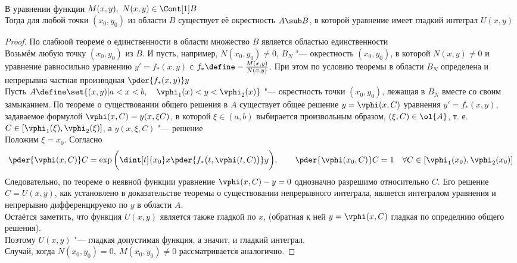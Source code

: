 \begin{theorem}
    \hfill \\
    В уравнении  функции $ M(x, y), ~ N(x, y) \in \Cont[1]B $ \\
    Тогда для любой точки $ (x_0, y_0) $ из области $ B $ существует её окрестность $ A \sub B $, в которой уравнение  имеет гладкий интеграл $ U(x, y) $
\end{theorem}

\begin{proof}
	По слабюой теореме о единственности в области множество $ B $ является областью единственности \\
    Возьмём любую точку $ (x_0, y_0) $ из $ B $. И пусть, например, $ N(x_0, y_0) \ne 0 $, $ B_N $ "--- окрестность $ (x_0, y_0) $, в которой $ N(x, y) \ne 0 $ и уравнение  равносильно уравнению  $ y' = f_*(x, y) $ с $ f_* \define - \frac{M(x, y)}{N(x, y)} $. При этом по условию теоремы в области $ B_N $ определена и непрерывна частная производная $ \pder{f_*(x, y)}y $ \\
    Пусть $ A \define \set{(x, y) | a < x < b, \quad \vphi_1(x) < y < \vphi_2(x)} $ "--- окрестность точки $ (x_0, y_0) $, лежащая в $ B_N $ вместе со своим замыканием. По теореме о существовании общего решения в $ A $ существует общее решение $ y = \vphi(x, C) $ уравнения $ y' = f_*(x, y) $, задаваемое формулой  $ \vphi(x, C) = y(x, \xi C) $, в которой $ \xi \in (a, b) $ выбирается произвольным образом, $ (\xi, C) \in \ol{A} $, т. е. $ C \in [\vphi_1(\xi), \vphi_2(\xi)] $, а $ y(x, \xi, C) $ "--- решение  \\
    Положим $ \xi = x_0 $. Согласно 
    $$ \pder{\vphi(x, C)}C = \exp \bigg( \dint[t]{x_0}x{\pder{f_* \big( t, \vphi(t, C) \big)}y} \bigg), \qquad \pder{\vphi(x_0, C)}C = 1 \quad \forall C \in [\vphi_1(x_0), \vphi_2(x_0)] $$
    Следовательно, по теореме о неявной функции уравнение $ \vphi(x, C) - y = 0 $ однозначно разрешимо относительно $ C $. Его решение $ C = U(x, y) $, как установлено в доказательстве теоремы о существовании непрерывного интеграла, является интегралом уравнения  и непрерывно дифференцируемо по $ y $ в области $ A $. \\
    Остаётся заметить, что функция $ U(x, y) $ является также гладкой по $ x $, (\as обратная к ней $ y = \vphi(x, C) $ гладкая по определнию общего решения). \\
    Поэтому $ U(x, y) $ "--- гладкая допустимая функция, а значит, и гладкий интеграл. \\
    Случай, когда $ N(x_0, y_0) = 0, ~ M(x_0, y_0) \ne 0 $ рассматривается аналогично.
\end{proof}

